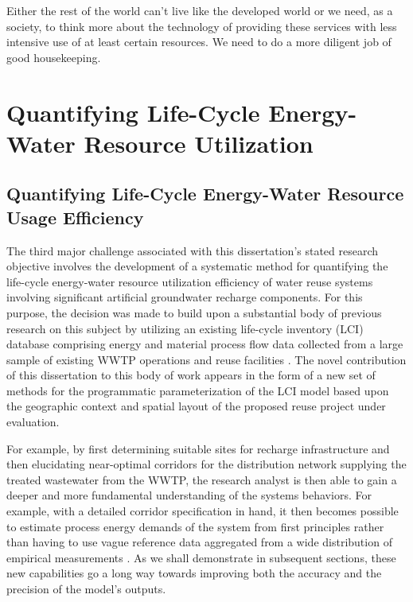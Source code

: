 \begin{savequote}[75mm]
Either the rest of the world can't live like the developed world or we need, as a society, to think more about the technology of providing these services with less intensive use of at least certain  resources. We need to do a more diligent job of good housekeeping.
\end{savequote}

\chapter{Quantifying Life-Cycle Energy-Water Resource Utilization}
\label{Chapter 3}

\newpage

\section{Quantifying Life-Cycle Energy-Water Resource Usage Efficiency}

The third major challenge associated with this dissertation's stated research objective involves the development of a systematic method for quantifying the life-cycle energy-water resource utilization efficiency of water reuse systems involving significant artificial groundwater recharge components. For this purpose, the decision was made to build upon a substantial body of previous research on this subject by utilizing an existing life-cycle inventory (LCI) database comprising energy and material process flow data collected from a large sample of existing WWTP operations and reuse facilities \cite{Stokes2006, Stokes2011, Stokes2014}. The novel contribution of this dissertation to this body of work appears in the form of a new set of methods for the programmatic parameterization of the LCI model based upon the geographic context and spatial layout of the proposed reuse project under evaluation. 

For example, by first determining suitable sites for recharge infrastructure and then elucidating near-optimal corridors for the distribution network supplying the treated wastewater from the WWTP, the research analyst is then able to gain a deeper and more fundamental understanding of the systems behaviors. For example, with a detailed corridor specification in hand, it then becomes possible to estimate process energy demands of the system from first principles rather than having to use vague reference data aggregated from a wide distribution of empirical measurements \cite{Klein2005}. As we shall demonstrate in subsequent sections, these new capabilities go a long way towards improving both the accuracy and the precision of the model's outputs.

